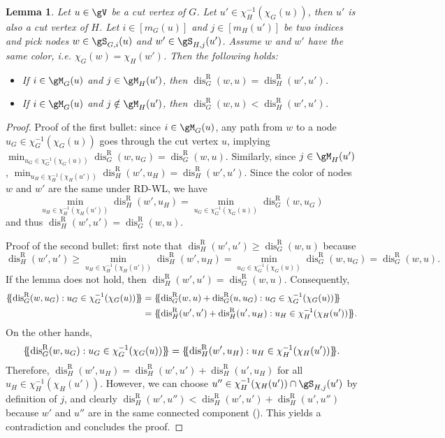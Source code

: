 \documentclass{article} %
\let\cref\crtcref
\newtheorem{lemma}[theorem]{Lemma}
\newcommand*{\ldblbrace}{\{\mskip-5mu\{}
\newcommand*{\rdblbrace}{\}\mskip-5mu\}}
\newcommand*{\disR}{\operatorname{dis}^\mathrm{R}}
\begin{document}
\begin{lemma}
\label{thm:proof_rdwl_part2_0}
Let $u\in\gV$ be a cut vertex of $G$. Let $u'\in\chi_H^{-1}(\chi_G(u))$, then $u'$ is also a cut vertex of $H$. Let $i\in [m_G(u)]$ and $j\in [m_H(u')]$ be two indices and pick nodes $w\in\gS_{G,i}(u)$ and $w'\in\gS_{H,j}(u')$. Assume $w$ and $w'$ have the same color, i.e. $\chi_G(w)=\chi_H(w')$. Then the following holds:
\begin{itemize}[topsep=0pt,leftmargin=30pt]
\setlength{\itemsep}{0pt}
    \item If $i\in\gM_G(u)$ and $j\in\gM_H(u')$, then $\disR_G(w,u)=\disR_H(w',u')$.
    \item If $i\in\gM_G(u)$ and $j\notin\gM_H(u')$, then $\disR_G(w,u)<\disR_H(w',u')$.
\end{itemize}
\end{lemma}
\begin{proof}
Proof of the first bullet: since $i\in\gM_G(u)$, any path from $w$ to a node $u_G\in\chi_G^{-1}(\chi_G(u))$ goes through the cut vertex $u$, implying $\min_{u_G\in\chi_G^{-1}(\chi_G(u))}\disR_G(w,u_G)=\disR_G(w,u)$. Similarly, since $j\in\gM_H(u')$,  $\min_{u_H\in\chi_H^{-1}(\chi_H(u'))}\disR_H(w',u_H)=\disR_H(w',u')$. Since the color of nodes $w$ and $w'$ are the same under RD-WL, we have 
$$\min_{u_H\in\chi_H^{-1}(\chi_H(u'))}\disR_H(w',u_H)=\min_{u_G\in\chi_G^{-1}(\chi_G(u))}\disR_G(w,u_G)$$ and thus $\disR_H(w',u')=\disR_G(w,u)$.

Proof of the second bullet: first note that $\disR_H(w',u')\ge \disR_G(w,u)$ because $$\disR_H(w',u')\ge \min_{u_H\in\chi_H^{-1}(\chi_H(u'))}\disR_H(w',u_H)=\min_{u_G\in\chi_G^{-1}(\chi_G(u))}\disR_G(w,u_G)=\disR_G(w,u).$$
If the lemma does not hold, then $\disR_H(w',u')= \disR_G(w,u)$. Consequently,
\begin{align*}
    \ldblbrace \disR_G(w,u_G):u_G\in\chi_G^{-1}(\chi_G(u))\rdblbrace 
    &=\ldblbrace \disR_G(w,u)+\disR_G(u,u_G):u_G\in\chi_G^{-1}(\chi_G(u))\rdblbrace \\
    &=\ldblbrace \disR_H(w',u')+\disR_H(u',u_H):u_H\in\chi_H^{-1}(\chi_H(u'))\rdblbrace.
\end{align*}
On the other hands, 
$$\ldblbrace\disR_G(w,u_G):u_G\in\chi_G^{-1}(\chi_G(u))\rdblbrace=\ldblbrace\disR_H(w',u_H):u_H\in\chi_H^{-1}(\chi_H(u'))\rdblbrace.$$
Therefore, $\disR_H(w',u_H)=\disR_H(w',u')+\disR_H(u',u_H)$ for all $u_H\in\chi_H^{-1}(\chi_H(u'))$. However, we can choose $u''\in\chi_H^{-1}(\chi_H(u'))\cap\gS_{H,j}(u')$ by definition of $j$, and clearly $\disR_H(w',u'')<\disR_H(w',u')+\disR_H(u',u'')$ because $w'$ and $u''$ are in the same connected component (\cref{thm:proof_rdwl_part1_0}). This yields a contradiction and concludes the proof.
\end{proof}
\end{document}
